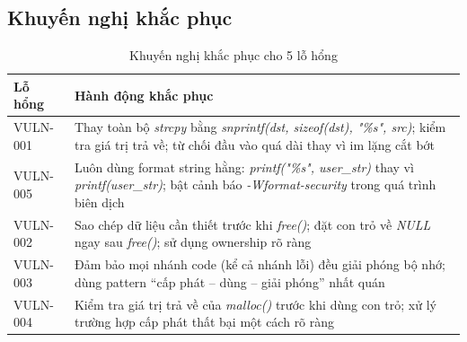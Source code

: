 \subsection{Khuyến nghị khắc phục}

\begin{table}[H]
\centering
\begin{tabularx}{\textwidth}{|p{1.6cm}|X|}
\hline
\textbf{Lỗ hổng} & \textbf{Hành động khắc phục} \\ \hline
VULN-001 & Thay toàn bộ \textit{strcpy} bằng \textit{snprintf(dst, sizeof(dst), "\%s", src)}; kiểm tra giá trị trả về; từ chối đầu vào quá dài thay vì im lặng cắt bớt \\ \hline
VULN-005 & Luôn dùng format string hằng: \textit{printf("\%s", user\_str)} thay vì \textit{printf(user\_str)}; bật cảnh báo \textit{-Wformat-security} trong quá trình biên dịch \\ \hline
VULN-002 & Sao chép dữ liệu cần thiết trước khi \textit{free()}; đặt con trỏ về \textit{NULL} ngay sau \textit{free()}; sử dụng ownership rõ ràng \\ \hline
VULN-003 & Đảm bảo mọi nhánh code (kể cả nhánh lỗi) đều giải phóng bộ nhớ; dùng pattern ``cấp phát -- dùng -- giải phóng'' nhất quán \\ \hline
VULN-004 & Kiểm tra giá trị trả về của \textit{malloc()} trước khi dùng con trỏ; xử lý trường hợp cấp phát thất bại một cách rõ ràng \\ \hline
\end{tabularx}
\caption{Khuyến nghị khắc phục cho 5 lỗ hổng}
\end{table}
